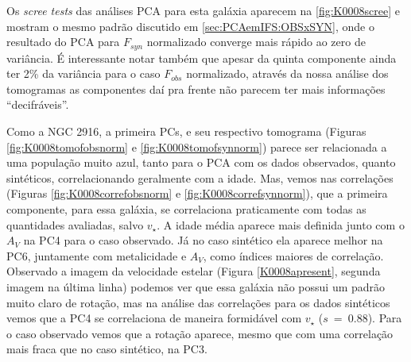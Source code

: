 Os {\em scree tests} das análises PCA para esta galáxia aparecem na \ref{fig:K0008scree} e mostram o mesmo padrão
discutido em \ref{sec:PCAemIFS:OBSxSYN}, onde o resultado do PCA para $F_{syn}$ normalizado converge mais rápido ao zero
de variância. É interessante notar também que apesar da quinta componente ainda ter 2\% da variância para o caso
$F_{obs}$ normalizado, através da nossa análise dos tomogramas as componentes daí pra frente não parecem ter mais
informações ``decifráveis''.

Como a NGC 2916, a primeira PCs, e seu respectivo tomograma (Figuras \ref{fig:K0008tomofobsnorm} e
\ref{fig:K0008tomofsynnorm}) parece ser relacionada a uma população muito azul, tanto para o PCA com os dados
observados, quanto sintéticos, correlacionando geralmente com a idade. Mas, vemos nas correlações (Figuras
\ref{fig:K0008correfobsnorm} e \ref{fig:K0008correfsynnorm}), que a primeira componente, para essa galáxia, se
correlaciona praticamente com todas as quantidades avaliadas, salvo $v_\star$. A idade média aparece mais definida junto
com o $A_V$ na PC4 para o caso observado. Já no caso sintético ela aparece melhor na PC6, juntamente com metalicidade e
$A_V$, como índices maiores de correlação. Observado a imagem da velocidade estelar (Figura \ref{K0008apresent}, segunda
imagem na última linha) podemos ver que essa galáxia não possui um padrão muito claro de rotação, mas na análise das
correlações para os dados sintéticos vemos que a PC4 se correlaciona de maneira formidável com $v_\star$ ($s\ =\ 0.88$).
Para o caso observado vemos que a rotação aparece, mesmo que com uma correlação mais fraca que no caso sintético, na
PC3.

